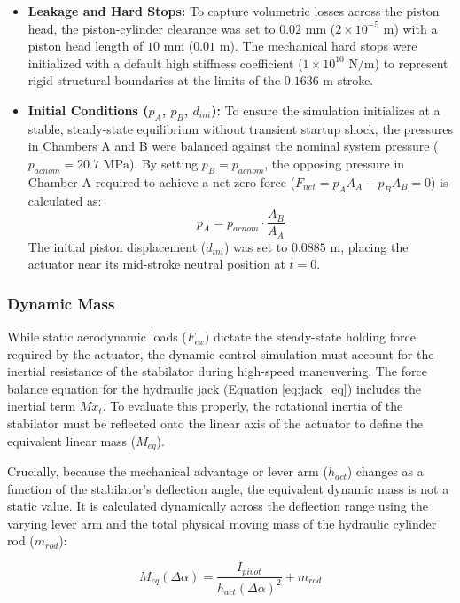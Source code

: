 \documentclass[
bindingoffset=5mm,  %
footnoteindent=3mm, %
hyphenation=true    %
]{src/wut-thesis}
\begin{document}
\begin{itemize}
		\item \textbf{Leakage and Hard Stops:} To capture volumetric losses across the piston head, the piston-cylinder clearance was set to $0.02 \text{ mm}$ ($2 \times 10^{-5} \text{ m}$) with a piston head length of $10 \text{ mm}$ ($0.01 \text{ m}$). The mechanical hard stops were initialized with a default high stiffness coefficient ($1 \times 10^{10} \text{ N/m}$) to represent rigid structural boundaries at the limits of the $0.1636 \text{ m}$ stroke.
		
		\item \textbf{Initial Conditions ($p_A$, $p_B$, $d_{ini}$):} To ensure the simulation initializes at a stable, steady-state equilibrium without transient startup shock, the pressures in Chambers A and B were balanced against the nominal system pressure ($p_{acnom} = 20.7 \text{ MPa}$). By setting $p_B = p_{acnom}$, the opposing pressure in Chamber A required to achieve a net-zero force ($F_{net} = p_A A_A - p_B A_B = 0$) is calculated as:
		$$p_A = p_{acnom} \cdot \frac{A_B}{A_A}$$
		The initial piston displacement ($d_{ini}$) was set to $0.0885 \text{ m}$, placing the actuator near its mid-stroke neutral position at $t=0$.
	\end{itemize}
	
	\subsubsection{Dynamic Mass}
	\label{sec:dynamicmass}
	
	While static aerodynamic loads ($F_{ex}$) dictate the steady-state holding force required by the actuator, the dynamic control simulation must account for the inertial resistance of the stabilator during high-speed maneuvering. The force balance equation for the hydraulic jack (Equation \ref{eq:jack_eq}) includes the inertial term $M\ddot{x}_t$. To evaluate this properly, the rotational inertia of the stabilator must be reflected onto the linear axis of the actuator to define the equivalent linear mass ($M_{eq}$).
	
	Crucially, because the mechanical advantage or lever arm ($h_{act}$) changes as a function of the stabilator's deflection angle, the equivalent dynamic mass is not a static value. It is calculated dynamically across the deflection range using the varying lever arm and the total physical moving mass of the hydraulic cylinder rod ($m_{rod}$):
	
	\begin{equation}
		M_{eq}(\Delta \alpha) = \frac{I_{pivot}}{h_{act}(\Delta \alpha)^2} + m_{rod}
	\end{equation}
	
\end{document}
